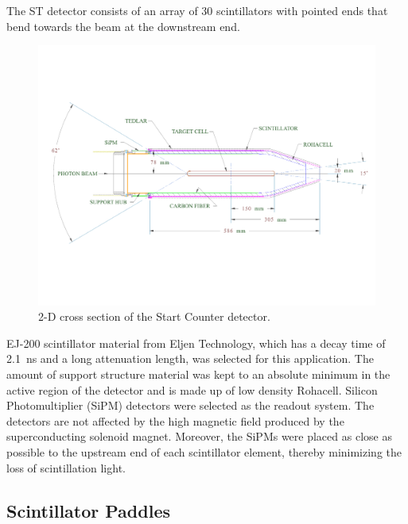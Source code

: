 The ST detector consists of an array of 30 scintillators with pointed ends that bend towards the beam at the downstream end. 
	\begin{figure}[!htb]
		\centering
		\includegraphics[width=1.0\columnwidth]{design/figs/st_2d_labels_fig_2.pdf}
		\caption{2-D cross section of the Start Counter detector.}
		\label{fig:st2dlabels}
	\end{figure}
EJ-200 scintillator material from Eljen Technology\cite{eljen}, which has a decay time of 2.1~ns and a long attenuation length\cite{ej200_specs}, was selected for this application.  The amount of support structure material was kept to an absolute minimum in the active region of the detector and is made up of low density Rohacell\cite{rohacell}. Silicon Photomultiplier (SiPM) detectors were selected as the readout system. The detectors are not affected by the high magnetic field produced by the superconducting solenoid magnet. Moreover, the SiPMs were placed as close as possible to the upstream end of each scintillator element, thereby minimizing the loss of scintillation light\cite{pooser16}.

\subsection{Scintillator Paddles} \label{sec:design_paddles}

